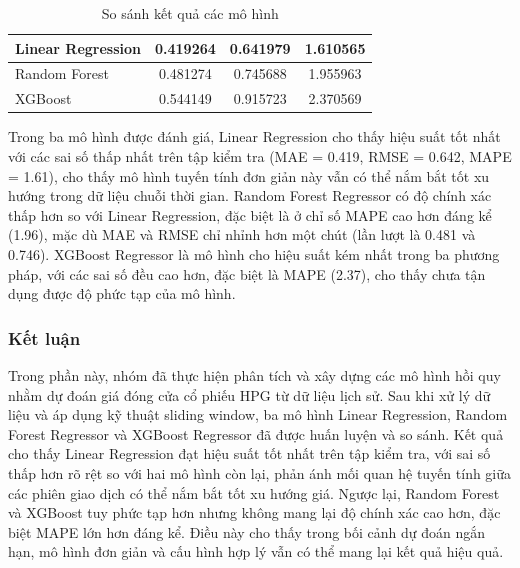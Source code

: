     \begin{table}[htbp]
        \centering
        \caption{So sánh kết quả các mô hình}
        \label{tab:stock-close-compare}
        \begin{tabular}{|l|c|c|c|}
        \hline
        Linear Regression & 0.419264 & 0.641979 & 1.610565 \\
        \hline
        Random Forest & 0.481274 & 0.745688 & 1.955963 \\
        \hline
        XGBoost & 0.544149 & 0.915723 & 2.370569 \\
        \hline
        \end{tabular}
    \end{table}

    \FloatBarrier

    Trong ba mô hình được đánh giá, Linear Regression cho thấy hiệu suất tốt nhất với các sai số thấp nhất trên tập kiểm tra (MAE = 0.419, RMSE = 0.642, MAPE = 1.61), cho thấy mô hình tuyến tính đơn giản này vẫn có thể nắm bắt tốt xu hướng trong dữ liệu chuỗi thời gian. Random Forest Regressor có độ chính xác thấp hơn so với Linear Regression, đặc biệt là ở chỉ số MAPE cao hơn đáng kể (1.96), mặc dù MAE và RMSE chỉ nhỉnh hơn một chút (lần lượt là 0.481 và 0.746). XGBoost Regressor là mô hình cho hiệu suất kém nhất trong ba phương pháp, với các sai số đều cao hơn, đặc biệt là MAPE (2.37), cho thấy chưa tận dụng được độ phức tạp của mô hình.

\subsubsection{Kết luận}
    Trong phần này, nhóm đã thực hiện phân tích và xây dựng các mô hình hồi quy nhằm dự đoán giá đóng cửa cổ phiếu HPG từ dữ liệu lịch sử. Sau khi xử lý dữ liệu và áp dụng kỹ thuật sliding window, ba mô hình Linear Regression, Random Forest Regressor và XGBoost Regressor đã được huấn luyện và so sánh. Kết quả cho thấy Linear Regression đạt hiệu suất tốt nhất trên tập kiểm tra, với sai số thấp hơn rõ rệt so với hai mô hình còn lại, phản ánh mối quan hệ tuyến tính giữa các phiên giao dịch có thể nắm bắt tốt xu hướng giá. Ngược lại, Random Forest và XGBoost tuy phức tạp hơn nhưng không mang lại độ chính xác cao hơn, đặc biệt MAPE lớn hơn đáng kể. Điều này cho thấy trong bối cảnh dự đoán ngắn hạn, mô hình đơn giản và cấu hình hợp lý vẫn có thể mang lại kết quả hiệu quả.